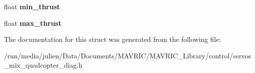 \begin{DoxyCompactItemize}
\item 
\hypertarget{structservo__mix__quadcopter__diag__conf__t_a1453cd0a6e7d3543d17218c8a33d9cb9}{float {\bfseries min\+\_\+thrust}}\label{structservo__mix__quadcopter__diag__conf__t_a1453cd0a6e7d3543d17218c8a33d9cb9}

\item 
\hypertarget{structservo__mix__quadcopter__diag__conf__t_a15db328932ed369b3b427984f8e75355}{float {\bfseries max\+\_\+thrust}}\label{structservo__mix__quadcopter__diag__conf__t_a15db328932ed369b3b427984f8e75355}

\end{DoxyCompactItemize}


The documentation for this struct was generated from the following file\+:\begin{DoxyCompactItemize}
\item 
/run/media/julien/\+Data/\+Documents/\+M\+A\+V\+R\+I\+C/\+M\+A\+V\+R\+I\+C\+\_\+\+Library/control/servos\+\_\+mix\+\_\+quadcopter\+\_\+diag.\+h\end{DoxyCompactItemize}
